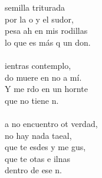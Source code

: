 \begin{cancion}
	 semilla triturada \\
	por la o y el sudor, \\
	pesa ah en mis rodillas\\
	lo que es más q un don.\\
	\jump\\
	ientras  contemplo, \\
	do muere en no a mí.\\
	Y me rdo en un hornte \\
	que no tiene n. \\
	\jump\\
	a no encuentro ot verdad,\\
	 no hay nada taeal,\\
	que te esdes y me gus,\\
	que te otas e ilnas\\
	dentro de ese n.\\
\end{cancion}%
